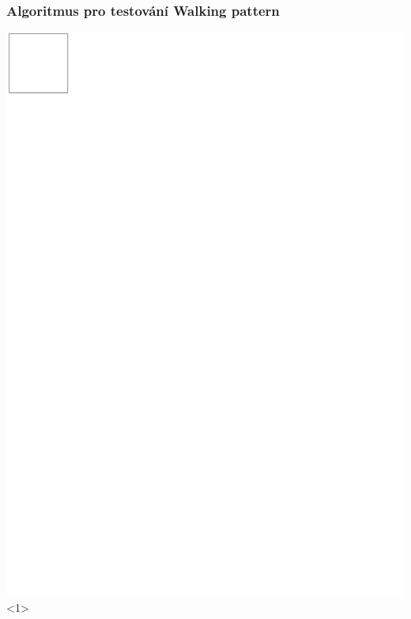 \documentclass{beamer}
\begin{document}
\begin{frame}
\frametitle{Algoritmus pro testování Walking pattern}
\centering
\includegraphics[scale=1.5]{../img/walkingalg0.pdf}<1>

\end{frame}
\end{document}

